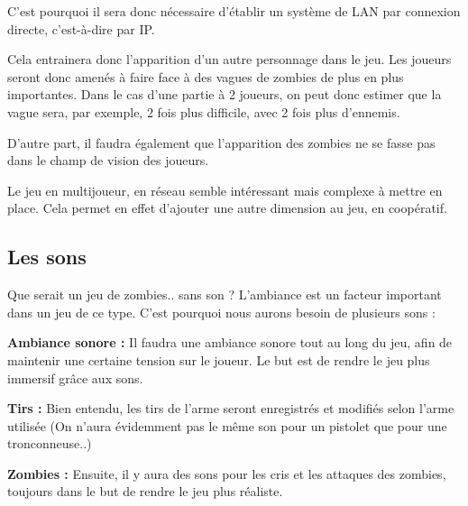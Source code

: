 \documentclass{article}
\begin{document}
\par
C'est pourquoi il sera donc nécessaire d'établir un système de LAN par connexion directe, c'est-à-dire par IP.
\newline

\par
Cela entrainera donc l'apparition d'un autre personnage dans le jeu. Les joueurs seront donc amenés à faire face à des vagues de zombies de plus en plus importantes.
Dans le cas d'une partie à 2 joueurs, on peut donc estimer que la vague sera, par exemple, 2 fois plus difficile, avec 2 fois plus d'ennemis.
\newline

\par
D'autre part, il faudra également que l'apparition des zombies ne se fasse pas dans le champ de vision des joueurs.
\newline

\par
Le jeu en multijoueur, en réseau semble intéressant mais complexe à mettre en place. Cela permet en effet d'ajouter une autre dimension au jeu, en coopératif.
\newline

\subsection{Les sons}

\par
Que serait un jeu de zombies.. sans son ? L'ambiance est un facteur important dans un jeu de ce type. C'est pourquoi nous aurons besoin de plusieurs sons :
\newline

\par
\textbf{Ambiance sonore :} Il faudra une ambiance sonore tout au long du jeu, afin de maintenir une certaine tension sur le joueur. Le but est de rendre le jeu plus immersif grâce aux sons.
\newline

\par
\textbf{Tirs :} Bien entendu, les tirs de l'arme seront enregistrés et modifiés selon l'arme utilisée (On n'aura évidemment pas le même son pour un pistolet que pour une tronconneuse..)
\newline

\par
\textbf{Zombies :} Ensuite, il y aura des sons pour les cris et les attaques des zombies, toujours dans le but de rendre le jeu plus réaliste. 
\newline
\end{document}
